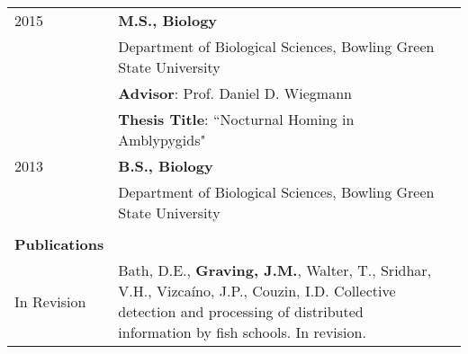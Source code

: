 \documentclass[letterpaper,10pt,oneside]{article}
\begin{document}
\begin{small}
\begin{longtable}{@{} l p{5.3in}l}
 \large{2015} 
  & \textbf{M.S., Biology} \\
     & {Department of Biological Sciences, Bowling Green State University}\vspace{1mm}  \\
         & \textbf{Advisor}: Prof. Daniel D. Wiegmann\\
    &\textbf{Thesis Title}: ``Nocturnal Homing in Amblypygids"
     & \vspace{5mm} \\
 \large{2013} 
  &\textbf{B.S., Biology} \\
      & {Department of Biological Sciences, Bowling Green State University} \\
    
     & \\
 \Large{\textbf{Publications}}  \vspace{5mm} \\
\large{In Revision}
& Bath, D.E., \textbf{Graving, J.M.}, Walter, T., Sridhar, V.H.,  Vizcaíno, J.P., Couzin, I.D. Collective detection and processing of distributed information by fish schools. In revision. \vspace{1mm} \\





\end{longtable}
\end{small}
\end{document}
